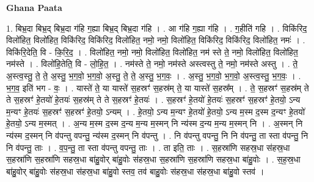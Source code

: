 \documentclass[17pt]{extarticle}
\begin{document}
\textbf{Ghana Paata } \newline

1. बिभ्र॒दा बिभ्र॒द् बिभ्र॒दा ग॑हि ग॒ह्या बिभ्र॒द् बिभ्र॒दा ग॑हि । . आ ग॑हि ग॒ह्या ग॑हि । . ग॒हीति॑ गहि । . विकि॑रिद॒ विलो॑हित॒ विलो॑हित॒ विकि॑रिद॒ विकि॑रिद॒ विलो॑हित॒ नमो॒ नमो॒ विलो॑हित॒ विकि॑रिद॒ विकि॑रिद॒ विलो॑हित॒ नमः॑ । . विकि॑रि॒देति॒ वि - कि॒रि॒द॒ । . विलो॑हित॒ नमो॒ नमो॒ विलो॑हित॒ विलो॑हित॒ नम॑ स्ते ते॒ नमो॒ विलो॑हित॒ विलो॑हित॒ नम॑स्ते । . विलो॑हि॒तेति॒ वि - लो॒हि॒त॒ । . नम॑स्ते ते॒ नमो॒ नम॑स्ते अस्त्वस्तु ते॒ नमो॒ नम॑स्ते अस्तु । . ते॒ अ॒स्त्व॒स्तु॒ ते॒ ते॒ अ॒स्तु॒ भ॒ग॒वो॒ भ॒ग॒वो॒ अ॒स्तु॒ ते॒ ते॒ अ॒स्तु॒ भ॒ग॒वः॒ । . अ॒स्तु॒ भ॒ग॒वो॒ भ॒ग॒वो॒ अ॒स्त्व॒स्तु॒ भ॒ग॒वः॒ । . भ॒ग॒व॒ इति॑ भग - वः॒ । . यास्ते॑ ते॒ या यास्ते॑ स॒हस्रꣳ॑ स॒हस्र॑म् ते॒ या यास्ते॑ स॒हस्र᳚म् । . ते॒ स॒हस्रꣳ॑ स॒हस्र॑म् ते ते स॒हस्रꣳ॑ हे॒तयो॑ हे॒तयः॑ स॒हस्र॑म् ते ते स॒हस्रꣳ॑ हे॒तयः॑ । . स॒हस्रꣳ॑ हे॒तयो॑ हे॒तयः॑ स॒हस्रꣳ॑ स॒हस्रꣳ॑ हे॒तयो॒ ऽन्य म॒न्यꣳ हे॒तयः॑ स॒हस्रꣳ॑ स॒हस्रꣳ॑ हे॒तयो॒ ऽन्यम् । . हे॒तयो॒ ऽन्य म॒न्यꣳ हे॒तयो॑ हे॒तयो॒ ऽन्य म॒स्म द॒स्म द॒न्यꣳ हे॒तयो॑ हे॒तयो॒ ऽन्य म॒स्मत् । . अ॒न्य म॒स्म द॒स्म द॒न्य म॒न्य म॒स्मन् नि न्य॑स्म द॒न्य म॒न्य म॒स्मन् नि । . अ॒स्मन् नि न्य॑स्म द॒स्मन् नि व॑पन्तु वपन्तु॒ न्य॑स्म द॒स्मन् नि व॑पन्तु । . नि व॑पन्तु वपन्तु॒ नि नि व॑पन्तु॒ ता स्ता व॑पन्तु॒ नि नि व॑पन्तु॒ ताः । . व॒प॒न्तु॒ ता स्ता व॑पन्तु वपन्तु॒ ताः । . ता इति॒ ताः । . स॒हस्रा॑णि सहस्र॒धा स॑हस्र॒धा स॒हस्रा॑णि स॒हस्रा॑णि सहस्र॒धा बा॑हु॒वोर् बा॑हु॒वोः स॑हस्र॒धा स॒हस्रा॑णि स॒हस्रा॑णि सहस्र॒धा बा॑हु॒वोः । . स॒ह॒स्र॒धा बा॑हु॒वोर् बा॑हु॒वोः स॑हस्र॒धा स॑हस्र॒धा बा॑हु॒वो स्तव॒ तव॑ बाहु॒वोः स॑हस्र॒धा स॑हस्र॒धा बा॑हु॒वो स्तव॑ । \newline
\end{document}
